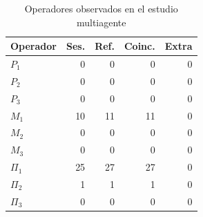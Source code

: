 \begin{table}[!t]
\caption{Operadores observados en el estudio multiagente}
\label{tab:multi_operators}
\centering\footnotesize
\begin{tabular}{lrrrr}
\hline
Operador & Ses. & Ref. & Coinc. & Extra\\
\hline
$P_1$ & 0 & 0 & 0 & 0\\
$P_2$ & 0 & 0 & 0 & 0\\
$P_3$ & 0 & 0 & 0 & 0\\
$M_1$ & 10 & 11 & 11 & 0\\
$M_2$ & 0 & 0 & 0 & 0\\
$M_3$ & 0 & 0 & 0 & 0\\
$\Pi_1$ & 25 & 27 & 27 & 0\\
$\Pi_2$ & 1 & 1 & 1 & 0\\
$\Pi_3$ & 0 & 0 & 0 & 0\\
\hline
\end{tabular}
\end{table}
